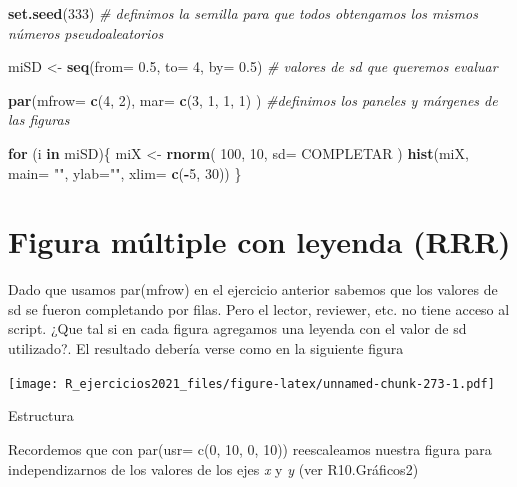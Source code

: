 \documentclass[]{book}
\newenvironment{Shaded}{\begin{snugshade}}{\end{snugshade}}
\newcommand{\CommentTok}[1]{\textcolor[rgb]{0.56,0.35,0.01}{\textit{#1}}}
\newcommand{\ControlFlowTok}[1]{\textcolor[rgb]{0.13,0.29,0.53}{\textbf{#1}}}
\newcommand{\DataTypeTok}[1]{\textcolor[rgb]{0.13,0.29,0.53}{#1}}
\newcommand{\DecValTok}[1]{\textcolor[rgb]{0.00,0.00,0.81}{#1}}
\newcommand{\FloatTok}[1]{\textcolor[rgb]{0.00,0.00,0.81}{#1}}
\newcommand{\KeywordTok}[1]{\textcolor[rgb]{0.13,0.29,0.53}{\textbf{#1}}}
\newcommand{\NormalTok}[1]{#1}
\newcommand{\OperatorTok}[1]{\textcolor[rgb]{0.81,0.36,0.00}{\textbf{#1}}}
\newcommand{\StringTok}[1]{\textcolor[rgb]{0.31,0.60,0.02}{#1}}
\begin{document}
\begin{Shaded}
\begin{Highlighting}[]
\KeywordTok{set.seed}\NormalTok{(}\DecValTok{333}\NormalTok{) }\CommentTok{# definimos la semilla para que todos obtengamos los mismos números pseudoaleatorios}

\NormalTok{miSD <-}\StringTok{ }\KeywordTok{seq}\NormalTok{(}\DataTypeTok{from=} \FloatTok{0.5}\NormalTok{, }\DataTypeTok{to=} \DecValTok{4}\NormalTok{, }\DataTypeTok{by=} \FloatTok{0.5}\NormalTok{) }\CommentTok{# valores de sd que queremos evaluar}

\KeywordTok{par}\NormalTok{(}\DataTypeTok{mfrow=} \KeywordTok{c}\NormalTok{(}\DecValTok{4}\NormalTok{, }\DecValTok{2}\NormalTok{), }\DataTypeTok{mar=} \KeywordTok{c}\NormalTok{(}\DecValTok{3}\NormalTok{, }\DecValTok{1}\NormalTok{, }\DecValTok{1}\NormalTok{, }\DecValTok{1}\NormalTok{) ) }\CommentTok{#definimos los paneles y márgenes de las figuras}

  \ControlFlowTok{for}\NormalTok{ (i }\ControlFlowTok{in}\NormalTok{ miSD)\{}
\NormalTok{    miX <-}\StringTok{ }\KeywordTok{rnorm}\NormalTok{( }\DecValTok{100}\NormalTok{, }\DecValTok{10}\NormalTok{, }\DataTypeTok{sd=}\NormalTok{ COMPLETAR )}
    \KeywordTok{hist}\NormalTok{(miX, }\DataTypeTok{main=} \StringTok{""}\NormalTok{, }\DataTypeTok{ylab=}\StringTok{""}\NormalTok{, }\DataTypeTok{xlim=} \KeywordTok{c}\NormalTok{(}\OperatorTok{-}\DecValTok{5}\NormalTok{, }\DecValTok{30}\NormalTok{))}
\NormalTok{    \}}
\end{Highlighting}
\end{Shaded}

\hypertarget{figura-muxfaltiple-con-leyenda-rrr}{%
\section{Figura múltiple con leyenda (RRR)}\label{figura-muxfaltiple-con-leyenda-rrr}}

Dado que usamos par(mfrow) en el ejercicio anterior sabemos que los valores de sd se fueron completando por filas. Pero el lector, reviewer, etc. no tiene acceso al script. ¿Que tal si en cada figura agregamos una leyenda con el valor de sd utilizado?. El resultado debería verse como en la siguiente figura

\texttt{[image: R\_ejercicios2021\_files/figure-latex/unnamed-chunk-273-1.pdf]}

Estructura

Recordemos que con par(usr= c(0, 10, 0, 10)) reescaleamos nuestra figura para independizarnos de los valores de los ejes \emph{x} y \emph{y} (ver R10.Gráficos2)
\end{document}
